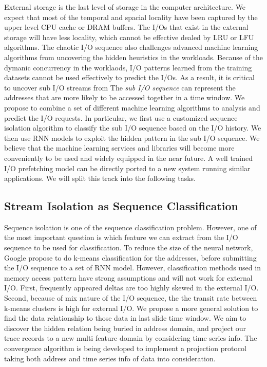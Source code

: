 External storage is the last level of storage in the computer architecture.
We expect that most of the temporal and spacial locality have been captured by the upper level CPU cache or DRAM buffers.
The I/Os that exist in the external storage will have less locality,
which cannot be effective dealed by LRU or LFU algorithms.
The chaotic I/O sequence also challenges advanced machine learning algorithms
from uncovering the hidden heuristics in the workloads.
Because of the dymanic concurrency in the worklaods,
I/O patterns learned from the training datasets
cannot be used effectively to predict the I/Os.
As a result, it is critical to uncover sub I/O streams from 
The \emph{sub I/O sequence} can represent the addresses that are more likely to be accessed together in a time window.
We propose to combine a set of different machine learning algorithms to analysis and predict the I/O requests.
In particular, we first use a customized sequence isolation algorithm to classify the sub I/O sequence based on the I/O history.
We then use RNN models to exploit the hidden pattern in the sub I/O sequence.
We believe that the machine learning services and libraries will become more conveniently to be used and widely equipped in the near future.
A well trained I/O prefetching model can be directly ported to a new system running similar applications.
We will split this track into the following tasks.

\subsection{Stream Isolation as Sequence Classification}

Sequence isolation is one of the sequence classification problem.
However, one of the most important question is which feature we can extract from the I/O sequence to be used for classification.
To reduce the size of the neural network, Google propose to do k-means classification for the addresses,
before submitting the I/O sequence to a set of RNN model\cite{hashemi2018learning}.
However, classification methods used in memory access pattern have strong assumptions and will not work for external I/O.
First, frequently appeared deltas are too highly skewed in the external I/O.
Second, because of mix nature of the I/O sequence, the the transit rate between k-means clusters is high for external I/O.
We propose a more general solution to find the data relationship to those data in last slide time window.
We aim to discover the hidden relation being buried in address domain,
and project our trace records to a new multi feature domain by considering time series info.
The convergence algorithm is being developed to implement a projection protocol
taking both address and time series info of data into consideration.

